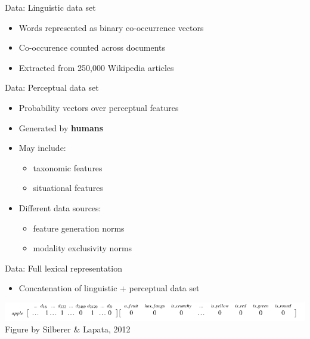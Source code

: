\documentclass[12pt,a4paper]{beamer}
\begin{document}
\begin{frame}{Data: Linguistic data set}
\begin{itemize}
\item Words represented as binary co-occurrence vectors
\item Co-occurence counted across documents
\item Extracted from 250,000 Wikipedia articles
\end{itemize}
\end{frame}


\begin{frame}{Data: Perceptual data set}
\begin{itemize}
\item Probability vectors over perceptual features
\item Generated by \textbf{humans}
\item May include:
    \begin{itemize}
    \item taxonomic features
    \item situational features
    \end{itemize}
\item Different data sources:
    \begin{itemize}
    \item feature generation norms
    \item modality exclusivity norms
    \end{itemize}
\end{itemize}
\end{frame}

\begin{frame}{Data: Full lexical representation}
\begin{itemize}
\item Concatenation of linguistic + perceptual data set
\end{itemize}
\includegraphics[width=\textwidth]{silber_lapata_example_lexical_representation_figure_3.png}
\\
\scriptsize{Figure by Silberer \& Lapata, 2012 \cite{silberer}}
\end{frame}
\end{document}

